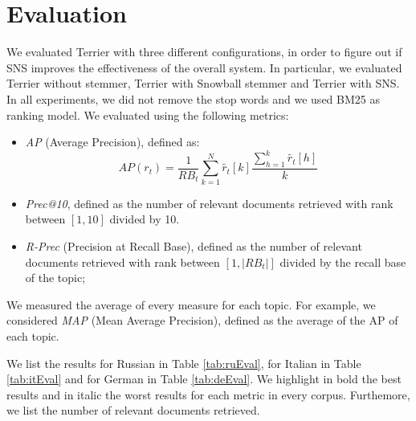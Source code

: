 \section{Evaluation}
We evaluated Terrier\cite{terrier} with three different configurations, in order to figure out if SNS improves the effectiveness of the overall system. In particular, we evaluated Terrier without stemmer, Terrier with Snowball\cite{snowball} stemmer and Terrier with SNS. In all experiments, we did not remove the stop words and we used BM25 as ranking model. We evaluated using the following metrics:

\begin{itemize}
\item \emph{AP} (Average Precision), defined as:
\begin{equation}
AP(r_t)=\frac{1}{RB_t}\sum_{k=1}^{N}\widetilde{r_t}[k]\frac{\sum_{h=1}^{k}\widetilde{r_t}[h]}{k}
\end{equation}

\item \emph{Prec@10}, defined as the number of relevant documents retrieved with rank between $[1, 10]$ divided by 10.

\item \emph{R-Prec} (Precision at Recall Base), defined as the number of relevant documents retrieved with rank between $[1,|RB_t|]$ divided by the recall base of the topic;




\end{itemize}

We measured the average of every measure for each topic. For example, we considered \emph{MAP} (Mean Average Precision), defined as the average of the AP of each topic.

We list the results for Russian in Table \ref{tab:ruEval}, for Italian in Table \ref{tab:itEval} and for German in Table \ref{tab:deEval}. We highlight in bold the best results and in italic the worst results for each metric in every corpus. Furthemore, we list the number of relevant documents retrieved.

